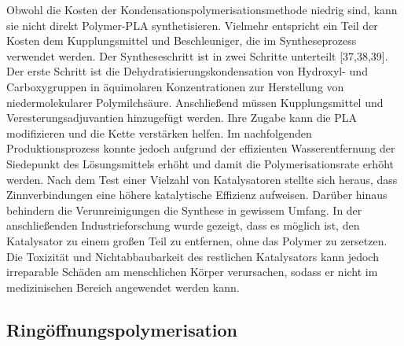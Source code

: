 \documentclass[10pt]{article}
\begin{document}
    Obwohl die Kosten der Kondensationspolymerisationsmethode niedrig sind, kann sie nicht direkt Polymer-PLA synthetisieren.
    Vielmehr entspricht ein Teil der Kosten dem Kupplungsmittel und Beschleuniger, die im Syntheseprozess verwendet werden.
    Der Syntheseschritt ist in zwei Schritte unterteilt [37,38,39].
    Der erste Schritt ist die Dehydratisierungskondensation von Hydroxyl- und Carboxygruppen in äquimolaren Konzentrationen zur Herstellung von niedermolekularer Polymilchsäure.
    Anschließend müssen Kupplungsmittel und Veresterungsadjuvantien hinzugefügt werden.
    Ihre Zugabe kann die PLA modifizieren und die Kette verstärken helfen.
    Im nachfolgenden Produktionsprozess konnte jedoch aufgrund der effizienten Wasserentfernung der Siedepunkt des Lösungsmittels erhöht und damit die Polymerisationsrate erhöht werden.
    Nach dem Test einer Vielzahl von Katalysatoren stellte sich heraus, dass Zinnverbindungen eine höhere katalytische Effizienz aufweisen.
    Darüber hinaus behindern die Verunreinigungen die Synthese in gewissem Umfang.
    In der anschließenden Industrieforschung wurde gezeigt, dass es möglich ist, den Katalysator zu einem großen Teil zu entfernen, ohne das Polymer zu zersetzen.
    Die Toxizität und Nichtabbaubarkeit des restlichen Katalysators kann jedoch irreparable Schäden am menschlichen Körper verursachen, sodass er nicht im medizinischen Bereich angewendet werden kann.

    \subsection{Ringöffnungspolymerisation}
\end{document}
